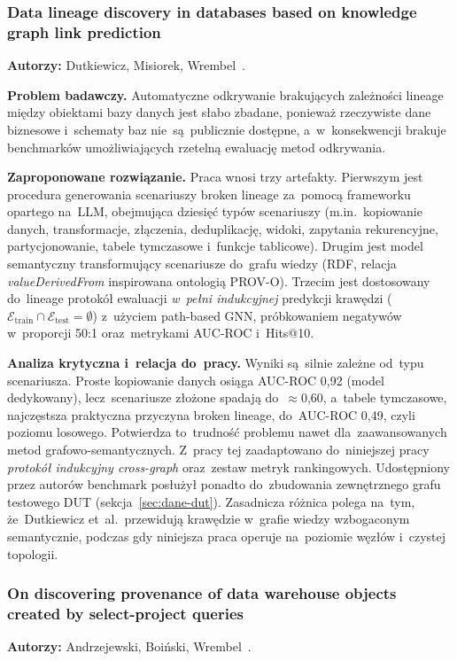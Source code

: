 \documentclass[polish,master,a4paper,oneside]{ppfcmthesis}
\renewcommand{\_}{\origtextunderscore\ifmmode\else\allowbreak\fi}
\begin{document}
\subsubsection{Data lineage discovery in databases based on knowledge graph
link prediction}
\noindent\textbf{Autorzy:} Dutkiewicz, Misiorek, Wrembel~\cite{Dutkiewicz2026}.

\noindent\textbf{Problem badawczy.}
Automatyczne odkrywanie brakujących zależności lineage między obiektami
bazy danych jest słabo zbadane, ponieważ rzeczywiste dane biznesowe
i~schematy baz nie~są~publicznie dostępne, a~w~konsekwencji brakuje
benchmarków umożliwiających rzetelną ewaluację metod odkrywania.

\noindent\textbf{Zaproponowane rozwiązanie.}
Praca wnosi trzy artefakty. Pierwszym jest procedura generowania scenariuszy
broken lineage za~pomocą frameworku opartego na~LLM, obejmująca dziesięć
typów scenariuszy (m.in.~kopiowanie danych, transformacje, złączenia,
deduplikację, widoki, zapytania rekurencyjne, partycjonowanie, tabele
tymczasowe i~funkcje tablicowe). Drugim jest model semantyczny
transformujący scenariusze do~grafu wiedzy (RDF, relacja
\emph{valueDerivedFrom} inspirowana ontologią PROV-O). Trzecim jest
dostosowany do~lineage protokół ewaluacji \emph{w~pełni indukcyjnej}
predykcji krawędzi ($\mathcal{E}_{\mathrm{train}} \cap
\mathcal{E}_{\mathrm{test}} = \emptyset$) z~użyciem path-based GNN,
próbkowaniem negatywów w~proporcji 50:1 oraz~metrykami AUC-ROC i~Hits@10.

\noindent\textbf{Analiza krytyczna i~relacja do~pracy.}
Wyniki są~silnie zależne od~typu scenariusza. Proste kopiowanie danych
osiąga AUC-ROC 0{,}92 (model dedykowany), lecz~scenariusze złożone spadają
do~$\approx$0{,}60, a~tabele tymczasowe, najczęstsza praktyczna
przyczyna broken lineage, do~AUC-ROC 0{,}49, czyli poziomu losowego.
Potwierdza to~trudność problemu nawet dla~zaawansowanych metod
grafowo-semantycznych. Z~pracy tej zaadaptowano do~niniejszej pracy
\emph{protokół indukcyjny cross-graph} oraz~zestaw metryk rankingowych.
Udostępniony przez autorów benchmark posłużył ponadto do~zbudowania
zewnętrznego grafu testowego DUT (sekcja~\ref{sec:dane-dut}). Zasadnicza
różnica polega na~tym, że~Dutkiewicz et~al.\ przewidują krawędzie w~grafie
wiedzy wzbogaconym semantycznie, podczas gdy niniejsza praca operuje
na~poziomie węzłów i~czystej topologii.

\subsubsection{On discovering provenance of data warehouse objects created
by select-project queries}
\noindent\textbf{Autorzy:} Andrzejewski, Boiński, Wrembel~\cite{Andrzejewski2026}.
\end{document}
